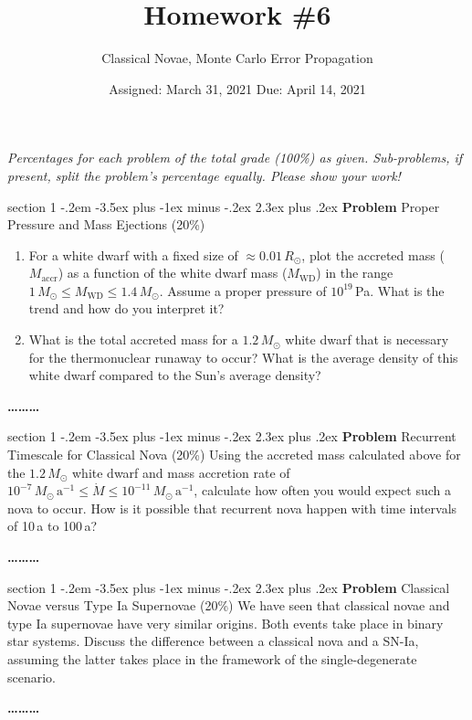 \documentclass[letterpaper,12pt,twoside=false,DIV=11]{scrartcl}
\makeatletter
\newcommand{\topic}{\author}
\newenvironment{problem}{\@startsection
    {section}
    {1}
    {-.2em}
    {-3.5ex plus -1ex minus -.2ex}
    {2.3ex plus .2ex}
    {
        \pagebreak[3] %
        \noindent\sffamily\bfseries Problem
    }
}
{
    \begin{center}\large\bfseries\ldots\ldots\ldots\end{center}
}
\makeatother
\begin{document}
\title{Homework \#6}
\topic{Classical Novae, Monte Carlo Error Propagation}
\date{Assigned: March 31, 2021 \qquad Due: April 14, 2021}

\maketitle
\thispagestyle{fancy}

\noindent\emph{Percentages for each problem of the total grade (100\%) as given. Sub-problems, if present, split the problem's percentage equally. Please show your work!}

\begin{problem}{Proper Pressure and Mass Ejections (20\%)}
\begin{enumerate}
    \item For a white dwarf with a fixed size of $\approx 0.01\,R_\odot$, plot the accreted mass ($M_\mathrm{accr}$) as a function of the white dwarf mass ($M_\mathrm{WD}$) in the range $1\,M_\odot \leq M_\mathrm{WD} \leq 1.4\,M_\odot$. Assume a proper pressure of $10^{19}$\,Pa. What is the trend and how do you interpret it?
    \item What is the total accreted mass for a $1.2\,M_\odot$ white dwarf that is necessary for the thermonuclear runaway to occur? What is the average density of this white dwarf compared to the Sun's average density?
\end{enumerate}
\end{problem}

\begin{problem}{Recurrent Timescale for Classical Nova (20\%)}
Using the accreted mass calculated above for the $1.2\,M_\odot$ white dwarf and mass accretion rate of $10^{-7}\,M_\odot\,\mathrm{a}^{-1} \leq \dot{M} \leq 10^{-11}\,M_\odot\,\mathrm{a}^{-1}$, calculate how often you would expect such a nova to occur. How is it possible that recurrent nova happen with time intervals of 10\,a to 100\,a?
\end{problem}

\begin{problem}{Classical Novae versus Type Ia Supernovae (20\%)}
We have seen that classical novae and type Ia supernovae have very similar origins. Both events take place in binary star systems. Discuss the difference between a classical nova and a SN-Ia, assuming the latter takes place in the framework of the single-degenerate scenario.
\end{problem}
\end{document}
